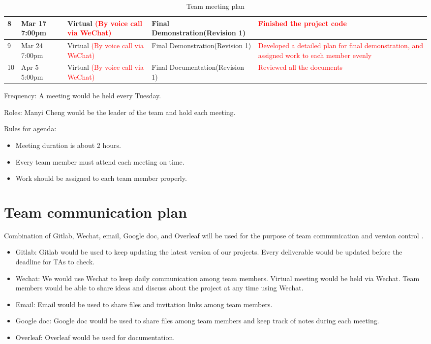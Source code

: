 \documentclass{article}
\begin{document}
\begin{table}[H]
    \begin{center}
    \begin{tabularx}{\textwidth}{|X|X|X|X|X|}
        \hline
        8 & Mar 17 7:00pm & Virtual \textcolor{red}{(By voice call via WeChat)}& Final Demonstration(Revision 1) & \textcolor{red}{Finished the project code}\\
        \hline
        9 & Mar 24 7:00pm & Virtual \textcolor{red}{(By voice call via WeChat)}& Final Demonstration(Revision 1) & \textcolor{red}{Developed a detailed plan for final demonstration, and assigned work to each member evenly}\\
        \hline
        10 & Apr 5 5:00pm & Virtual \textcolor{red}{(By voice call via WeChat)}& Final Documentation(Revision 1) & \textcolor{red}{Reviewed all the documents}\\
        \hline
        
    \end{tabularx}
    \caption{Team meeting plan}
    \label{tab:meeting plan}
    \end{center}
\end{table}
\FloatBarrier
Frequency: A meeting would be held every Tuesday.

Roles: Manyi Cheng would be the leader of the team and hold each meeting.

Rules for agenda:
\begin{itemize}
    \item Meeting duration is about 2 hours.
    \item Every team member must attend each meeting on time.
    \item Work should be assigned to each team member properly.
\end{itemize}
\section{Team communication plan}
Combination of Gitlab, Wechat, email, Google doc, and Overleaf will be used for the purpose of team communication and version control .
\begin{itemize}
    \item Gitlab: Gitlab would be used to keep updating the latest version of our projects. Every deliverable would be updated before the deadline for TAs to check.
    \item Wechat: We would use Wechat to keep daily communication among team members. Virtual meeting would be held via Wechat. Team members would be able to share ideas and discuss about the project at any time using Wechat.
    \item Email: Email would be used to share files and invitation links among team members.
    \item Google doc: Google doc would be used to share files among team members and keep track of notes during each meeting.
    \item Overleaf: Overleaf would be used for documentation.
\end{itemize}
\end{document}

